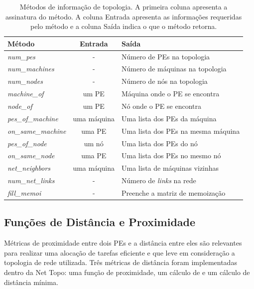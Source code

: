 \setlength{\tabcolsep}{0.5em}
\begin{table}[t]
    \centering
    \begin{tabular}{l c l}
        \toprule
        \textbf{Método} &    \textbf{Entrada} &    \textbf{Saída} \\ \midrule
        \textit{num\_pes} &    - &    Número de PEs na topologia   \\ 
        \textit{num\_machines} &    - &    Número de máquinas na topologia   \\
        \textit{num\_nodes} &    - &    Número de nós na topologia   \\
        \textit{machine\_of} & um PE & Máquina onde o PE se encontra  \\
        \textit{node\_of} & um PE & Nó onde o PE se encontra  \\
        \textit{pes\_of\_machine} &  uma máquina & Uma lista dos PEs da máquina \\
        \textit{on\_same\_machine} &  uma PE & Uma lista dos PEs na mesma máquina \\
        \textit{pes\_of\_node} &  um nó & Uma lista dos PEs do nó \\
        \textit{on\_same\_node} &  uma PE & Uma lista dos PEs no mesmo nó \\
        \textit{net\_neighbors} &  uma máquina & Uma lista de máquinas vizinhas \\ \textit{num\_net\_links} & - & Número de \textit{links} na rede \\
        \textit{fill\_memoi} & - & Preenche a matriz de memoização \\
        \bottomrule
    \end{tabular}
    \caption[Métodos de informação de topologia.]{Métodos de informação de topologia. A primeira coluna apresenta a assinatura do método. A coluna Entrada apresenta as informações requeridas pelo método e a coluna Saída indica o que o método retorna.}
    \label{tab:topo_infos}
\end{table}

\subsection{Funções de Distância e Proximidade}
\label{sec:distances}

Métricas de proximidade entre dois PEs e a distância entre eles são relevantes para realizar uma alocação de tarefas eficiente e que leve em consideração a topologia de rede utilizada.
Três métricas de distância foram implementadas dentro da Net Topo: uma função de proximidade, um cálculo de \hops e um cálculo de distância mínima.

